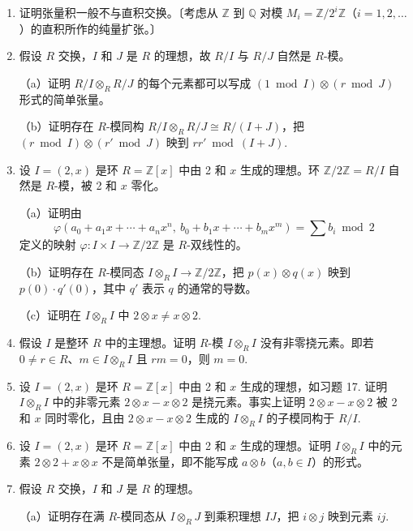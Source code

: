 \begin{enumerate}
\item 证明张量积一般不与直积交换。〔考虑从 \(\mathbb{Z}\) 到 \(\mathbb{Q}\) 对模 \(M_i = \mathbb{Z}/2^i\mathbb{Z}\)（\(i = 1, 2, \ldots\)）的直积所作的纯量扩张。〕

\item 假设 \(R\) 交换，\(I\) 和 \(J\) 是 \(R\) 的理想，故 \(R/I\) 与 \(R/J\) 自然是 \(R\)-模。

（a）证明 \(R/I \otimes_R R/J\) 的每个元素都可以写成 \((1 \bmod I) \otimes (r \bmod J)\) 形式的简单张量。

（b）证明存在 \(R\)-模同构 \(R/I \otimes_R R/J \cong R/(I+J)\)，把 \((r \bmod I) \otimes (r' \bmod J)\) 映到 \(rr' \bmod (I+J)\).

\item 设 \(I = (2, x)\) 是环 \(R = \mathbb{Z}[x]\) 中由 2 和 \(x\) 生成的理想。环 \(\mathbb{Z}/2\mathbb{Z} = R/I\) 自然是 \(R\)-模，被 2 和 \(x\) 零化。

（a）证明由
\[
\varphi(a_0+a_1x+\cdots+a_nx^n,\ b_0+b_1x+\cdots+b_mx^m) = \sum b_i \bmod 2
\]
定义的映射 \(\varphi : I \times I \to \mathbb{Z}/2\mathbb{Z}\) 是 \(R\)-双线性的。

（b）证明存在 \(R\)-模同态 \(I \otimes_R I \to \mathbb{Z}/2\mathbb{Z}\)，把 \(p(x) \otimes q(x)\) 映到 \(p(0)\cdot q'(0)\)，其中 \(q'\) 表示 \(q\) 的通常的导数。

（c）证明在 \(I \otimes_R I\) 中 \(2 \otimes x \neq x \otimes 2\).

\item 假设 \(I\) 是整环 \(R\) 中的主理想。证明 \(R\)-模 \(I \otimes_R I\) 没有非零挠元素。即若 \(0 \neq r \in R\)、\(m \in I \otimes_R I\) 且 \(rm = 0\)，则 \(m = 0\).

\item 设 \(I = (2, x)\) 是环 \(R = \mathbb{Z}[x]\) 中由 2 和 \(x\) 生成的理想，如习题 17. 证明 \(I \otimes_R I\) 中的非零元素 \(2 \otimes x-x \otimes 2\) 是挠元素。事实上证明 \(2 \otimes x-x \otimes 2\) 被 2 和 \(x\) 同时零化，且由 \(2 \otimes x-x \otimes 2\) 生成的 \(I \otimes_R I\) 的子模同构于 \(R/I\).

\item 设 \(I = (2, x)\) 是环 \(R = \mathbb{Z}[x]\) 中由 2 和 \(x\) 生成的理想。证明 \(I \otimes_R I\) 中的元素 \(2 \otimes 2+x \otimes x\) 不是简单张量，即不能写成 \(a \otimes b\)（\(a, b \in I\)）的形式。

\item 假设 \(R\) 交换，\(I\) 和 \(J\) 是 \(R\) 的理想。

（a）证明存在满 \(R\)-模同态从 \(I \otimes_R J\) 到乘积理想 \(IJ\)，把 \(i \otimes j\) 映到元素 \(ij\).


\end{enumerate}
